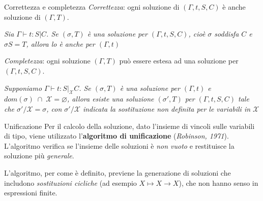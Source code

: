 \documentclass{beamer}
\begin{document}

\begin{tframe}{Correttezza e completezza}
\emph{Correttezza}: ogni soluzione di $(\Gamma, t, S, C)$ è anche soluzione di $(\Gamma, T)$.

\vspace{0.1cm}

\begin{theorem}
\textit{Sia $\Gamma \vdash t : S | C$. Se $(\sigma, T)$ è una soluzione per $(\Gamma , t, S, C)$, cioè $\sigma$ soddisfa $C$ e $\sigma S = T$, allora lo è anche per $(\Gamma, t)$}
\end{theorem}

\vspace{0.1cm}

\emph{Completezza}: ogni soluzione $(\Gamma, T)$ può essere estesa ad una soluzione per $(\Gamma, t, S, C)$.

\vspace{0.1cm}


\begin{theorem}
\textit{Supponiamo $\Gamma \vdash t : S |_{\mathcal{X}} C$. Se $(\sigma, T)$ è una soluzione per $(\Gamma, t)$ e $dom(\sigma) \; \cap \; \mathcal{X} = \varnothing$, allora esiste una soluzione $(\sigma', T)$ per $(\Gamma, t, S, C)$ tale che $\sigma' / \mathcal{X} = \sigma$, con $\sigma' / \mathcal{X}$ indicata la sostituzione non definita per le variabili in $\mathcal{X}$}
\end{theorem}
\end{tframe}


\begin{tframe}{Unificazione}
Per il calcolo della soluzione, dato l'insieme di vincoli sulle variabili di tipo, viene utilizzato l'\textbf{algoritmo di unificazione} (\textit{Robinson, 1971}). L'algoritmo verifica se l'insieme delle soluzioni è \emph{non vuoto} e restituisce la soluzione più \emph{generale}.

\vspace{0.6cm}

L'algoritmo, per come è definito, previene la generazione di soluzioni che includono \emph{sostituzioni cicliche} (ad esempio $X \mapsto X \rightarrow X$), che non hanno senso in espressioni finite.

\end{tframe}
\end{document}
